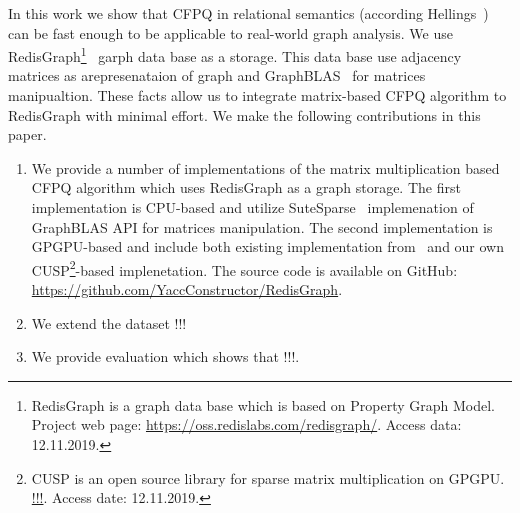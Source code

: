 

In this work we show that CFPQ in relational semantics (according Hellings~\cite{hellingsRelational}) can be fast enough to be applicable to real-world graph analysis.
We use RedisGraph\footnote{RedisGraph is a graph data base which is based on Property Graph Model. Project web page: \url{https://oss.redislabs.com/redisgraph/}. Access data: 12.11.2019.}~\cite{8778293} garph data base as a storage.
This data base use adjacency matrices as arepresenataion of graph and GraphBLAS~\cite{7761646} for matrices manipualtion. 
These facts allow us to integrate matrix-based CFPQ algorithm to RedisGraph with minimal effort.
We make the following contributions in this paper.
\begin{enumerate}
\item We provide a number of implementations of the matrix multiplication based CFPQ algorithm which uses RedisGraph as a graph storage.
The first implementation is CPU-based and utilize SuteSparse~\cite{!!!} implemenation of GraphBLAS API for matrices manipulation.
The second implementation is GPGPU-based and include both existing implementation from~\cite{!!!} and our own CUSP\footnote{CUSP is an open source library for sparse matrix multiplication on GPGPU. \url{!!!}. Access date: 12.11.2019.}-based implenetation.
The source code is available on GitHub: \url{https://github.com/YaccConstructor/RedisGraph}.
\item We extend the dataset !!!
\item We provide evaluation which shows that !!!.
\end{enumerate}
